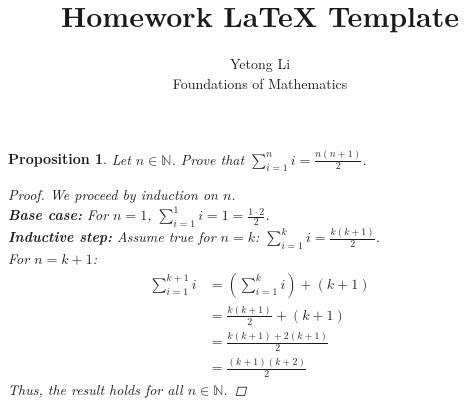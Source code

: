 \documentclass[12pt]{article}
\newtheorem{proposition}{Proposition}
\begin{document}

\title{Homework LaTeX Template}
\author{Yetong Li \\ Foundations of Mathematics} %

\maketitle


\begin{proposition}
  Let $n \in \mathbb{N}$. Prove that $\sum_{i=1}^n i = \frac{n(n+1)}{2}$.
  \begin{proof}
    We proceed by induction on $n$. \\
    \textbf{Base case:} For $n=1$, $\sum_{i=1}^1 i = 1 = \frac{1 \cdot 2}{2}$. \\
    \textbf{Inductive step:} Assume true for $n=k$: $\sum_{i=1}^k i = \frac{k(k+1)}{2}$. \\
    For $n=k+1$:
    \begin{align*}
      \sum_{i=1}^{k+1} i & = \left(\sum_{i=1}^k i\right) + (k+1) \\
                         & = \frac{k(k+1)}{2} + (k+1)            \\
                         & = \frac{k(k+1) + 2(k+1)}{2}           \\
                         & = \frac{(k+1)(k+2)}{2}
    \end{align*}
    Thus, the result holds for all $n \in \mathbb{N}$.
  \end{proof}
\end{proposition}


\end{document}
